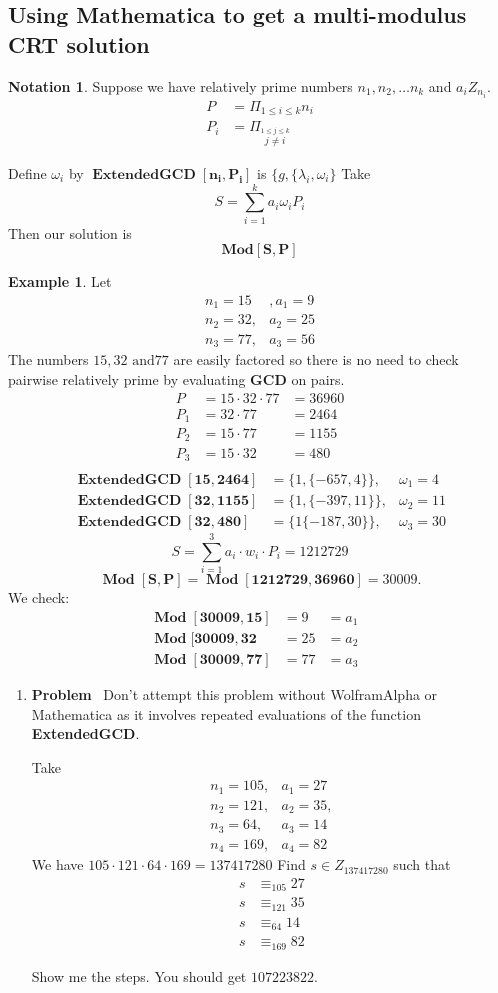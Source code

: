 \documentclass[12pt]{amsart}
\theoremstyle{definition}
\newtheorem{notation}[theorem]{Notation}
\newcommand{\bnot}{\begin{notation}}
\newcommand{\enot}{\end{notation}}
\newtheorem{example}[theorem]{Example}
\newcommand{\bax}{\begin{example}}
\newcommand{\ax}{\end{example}}
\DeclareMathOperator{\ExtendedGCD}{ExtendedGCD}
\DeclareMathOperator{\Mod}{Mod}
\newcommand{\itep}{\item {\bfseries Problem}\ }
\begin{document}
\subsection{Using Mathematica to get a multi-modulus  CRT solution}
\bnot
Suppose we have relatively prime numbers $n_1,n_2,\dots n_k$ and $a_iZ_{n_i}$.  
\begin{align*}
P&=\Pi_{1\leq i\leq k}n_i\\
P_i&=\Pi_{\overset{1\leq j\leq k}{j\neq i}}
\end{align*}
\enot
Define $\omega_i$ by $\bm{\ExtendedGCD[n_i,P_i]}$ is $\{g,\{\lambda_i,\omega_i\}$
Take 
\[S=\sum_{i=1}^ka_i\omega_iP_i\]
Then our solution is 
\[\bm{Mod[S,P]}\]
\bax Let 
\begin{align*}n_1=15&,a_1=9\\n_2=32, &a_2=25\\n_3=77, &a_3=56
\end{align*} 
The numbers $15,32 \text{ and} 77$ are easily factored so there is no need to check pairwise relatively prime by evaluating {\bfseries GCD} on pairs.
\begin{align*}
P&=15\cdot32\cdot 77&=36960\\
P_1&=32\cdot77&=2464\\
P_2&=15\cdot 77&=1155\\
P_3&=15\cdot32&=480\\
\end{align*}
\begin{align*}
\bm{\ExtendedGCD[15,2464]}&=\{1,\{-657,4\}\},&\omega_1=4\\
\bm{\ExtendedGCD[32,1155]}&=\{1,\{-397,11\}\},&\omega_2=11\\
\bm{\ExtendedGCD[32,480]}&=\{1\{-187,30\}\},&\omega_3=30
\end{align*}
\[S=\sum_{i=1}^3 a_i\cdot w_i\cdot P_i=1212729\]
\[
\bm{\Mod[S,P]}=\bm{\Mod[1212729,36960]}=30009.
\]
We check:
\begin{align*}
\bm{\Mod[30009,15]}&=9&=a_1&\\
\bm{\Mod[30009,32}&=25&=a_2\\
\bm{\Mod[30009,77]}&=77&=a_3
\end{align*}
\ax
\begin{enumerate}[resume=p]
\itep
Don't attempt this problem without WolframAlpha or Mathematica as it involves repeated evaluations of  the function
{\bfseries ExtendedGCD}.

Take
\begin{align*}
n_1=105,&a_1=27\\
n_2=121,&a_2=35,\\
n_3=64,&a_3=14\\
n_4=169,&a_4=82
\end{align*}
We have $105\cdot121\cdot 64\cdot 169=137417280$
Find $s \in Z_{137417280}$ such that 
\begin{align*} 
s &\equiv_{105} 27\\
s &\equiv_{121}35\\
s &\equiv_{64} 14\\
s&\equiv_{169}82
\end{align*}

Show me the steps. You should get $107223822$.
\end{enumerate}
\end{document}
